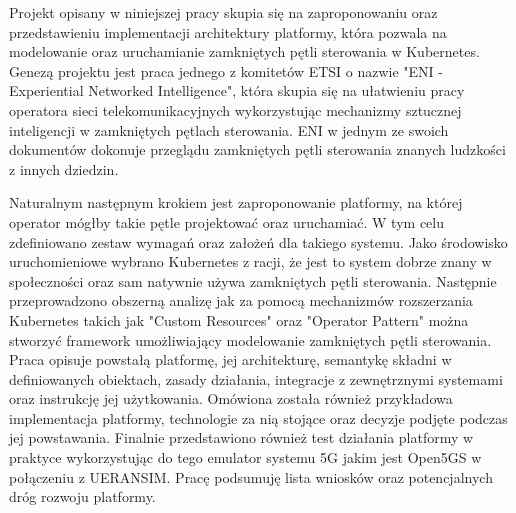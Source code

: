 Projekt opisany w niniejszej pracy skupia się na zaproponowaniu oraz przedstawieniu implementacji  architektury platformy, która pozwala na modelowanie oraz uruchamianie zamkniętych pętli sterowania w Kubernetes. Genezą projektu jest praca jednego z komitetów ETSI o nazwie "ENI - Experiential Networked Intelligence", która skupia się na ułatwieniu pracy operatora sieci telekomunikacyjnych wykorzystując mechanizmy sztucznej inteligencji w zamkniętych pętlach sterowania. ENI w jednym ze swoich dokumentów dokonuje przeglądu zamkniętych pętli sterowania znanych ludzkości z innych dziedzin. 

Naturalnym następnym krokiem jest zaproponowanie platformy, na której operator mógłby takie pętle projektować oraz uruchamiać. W tym celu zdefiniowano zestaw wymagań oraz założeń dla takiego systemu. Jako środowisko uruchomieniowe wybrano  Kubernetes z racji, że jest to system dobrze znany w społeczności oraz sam natywnie używa zamkniętych pętli sterowania. Następnie przeprowadzono obszerną analizę jak za pomocą mechanizmów rozszerzania Kubernetes takich jak "Custom Resources" oraz "Operator Pattern" można stworzyć framework umożliwiający modelowanie zamkniętych pętli sterowania. Praca opisuje powstałą platformę, jej architekturę, semantykę składni w definiowanych obiektach, zasady działania, integracje z zewnętrznymi systemami oraz instrukcję jej użytkowania. Omówiona została również przykładowa implementacja platformy, technologie za nią stojące oraz decyzje podjęte podczas jej powstawania. Finalnie przedstawiono również test działania platformy w praktyce wykorzystując do tego emulator systemu 5G jakim jest Open5GS w połączeniu z UERANSIM. Pracę podsumuję lista wniosków oraz potencjalnych dróg rozwoju platformy. 